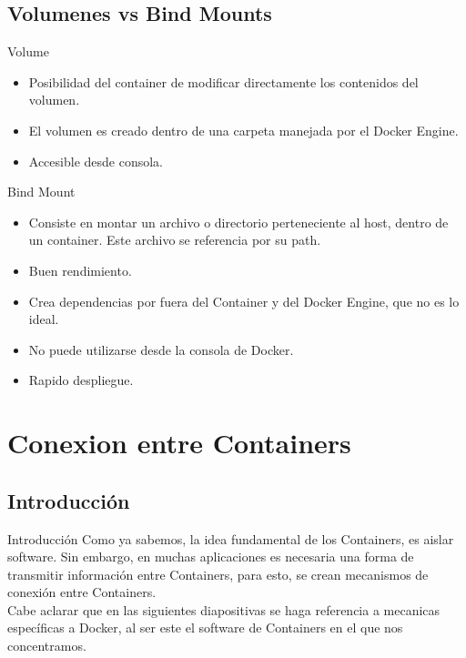 \documentclass{beamer}
\begin{document}
\subsection{Volumenes vs Bind Mounts}

\begin{frame}
	Volume
	\begin{itemize}
		\item
		Posibilidad del container de modificar directamente los contenidos del volumen.
		\item
		El volumen es creado dentro de una carpeta manejada por el Docker Engine.
		\item
		Accesible desde consola.
	\end{itemize}
	Bind Mount
	\begin{itemize}
		\item
		Consiste en montar un archivo o directorio perteneciente al host, dentro de un container. Este archivo se referencia por su path.
		\item
		Buen rendimiento.
		\item
		Crea dependencias por fuera del Container y del Docker Engine, que no es lo ideal.
		\item
		No puede utilizarse desde la consola de Docker.
		\item
		Rapido despliegue.
	\end{itemize}
\end{frame}

\begin{frame}
	
\end{frame}

\section{Conexion entre Containers}

\subsection{Introducción}

\begin{frame}{Introducción}
	Como ya sabemos, la idea fundamental de los Containers, es aislar software. Sin embargo, en muchas aplicaciones es necesaria una forma de transmitir información entre Containers, para esto, se crean mecanismos de conexión entre Containers. \\Cabe aclarar que en las siguientes diapositivas se haga referencia a mecanicas específicas a Docker, al ser este el software de Containers en el que nos concentramos.
\end{frame}
\end{document}
